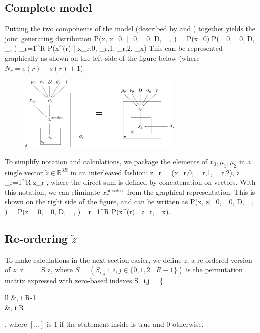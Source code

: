 \subsection{Complete model}
Putting the two components of the model (described by  and ) together yields the joint generating distribution
\bel
	P(x, x_0, \mu\;|\;\mu_0, \nu_0, D, \sigma_\mu, \tau) = P(x_0)\; P\Big(\mu\;\Big|\;\mu_0, \nu_0, D, \sigma_\mu, \tau\Big) \prod_{r=1}^R P\Big(x^{(r)} \;\Big|\; x_{r,0}, \mu_{r,1}, \mu_{r,2}, \sigma_x\Big)
\eel
This can be represented graphically as shown on the left side of the figure below (where $N_r = e(r) - s(r) + 1$).
\begin{figure}[h]
	\centering
	\includegraphics[width=0.7\textwidth]{./figs/graphical_model.pdf}
\end{figure}

To simplify notation and calculations, we package the elements of $x_0, \mu_1, \mu_2$ in a single vector $\tilde z\in \mathds{R}^{3R}$ in an interleaved fashion:
\be
	z_r = (x_{r,0}, \,\mu_{r,1}, \,\mu_{r,2})\quad, \qquad \tilde z = \bigoplus_{r=1}^R z_r \quad,
\ee
where the direct sum is defined by concatenation on vectors.
With this notation, we can eliminate $x_r^\text{noiseless}$ from the graphical representation. This is shown on the right side of the figure, and can be written as
\be
	P(x, \tilde z\;|\;\mu_0, \nu_0, D, \sigma_\mu, \tau) = P\Big(\tilde z\;\Big|\; \mu_0, \nu_0, D, \sigma_\mu, \tau\Big) \prod_{r=1}^R P\Big(x^{(r)} \;\Big|\; z_r, \sigma_x\Big)\quad .
\ee

\subsection{Re-ordering $\tilde z$}
To make calculations in the next section easier, we define $z$, a re-ordered version of $\tilde z$:
\bel
\label{eq:def_S}
	z =  \left[\bigoplus_{r=1}^R x_{r,0}\right]\oplus \left[\bigoplus_{r=1}^R (\mu_{r,1}, \mu_{r,2})\right] = S \tilde z\quad ,
\eel
where $S = (S_{i,j}\;:\; i,j\in\{0,1,2\ldots R-1\})$ is the permutation matrix expressed with zero-based indexes
\ba
	S_{i,j} = \left\{
	\begin{array}{ll}
		\big[j = 3i\big] &, \quad {}\quad i \leq R-1 \\
		\big[j = i - R + 1 + \text{floor}\big((i-R)/2\big)\big] &, \quad {}\quad i \geq R
	\end{array}
	\right.
\ea
where $[\ldots]$ is 1 if the statement inside is true and 0 otherwise.

